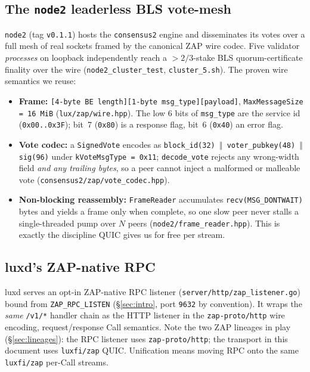 \documentclass[11pt,a4paper]{article}
\newcommand{\code}[1]{\texttt{#1}}
\begin{document}
\subsection{The \texttt{node2} leaderless BLS vote-mesh}\label{sec:proven-node2}

\code{node2} (tag \code{v0.1.1}) hosts the \code{consensus2} engine and
disseminates its votes over a full mesh of real sockets framed by the
canonical ZAP wire codec. Five validator \emph{processes} on loopback
independently reach a $>2/3$-stake BLS quorum-certificate finality over
the wire (\code{node2\_cluster\_test}, \code{cluster\_5.sh}). The proven
wire semantics we reuse:

\begin{itemize}[nosep]
  \item \textbf{Frame:} \code{[4-byte BE length][1-byte msg\_type][payload]},
        \code{MaxMessageSize = 16\,MiB} (\code{lux/zap/wire.hpp}). The
        low 6 bits of \code{msg\_type} are the service id
        (\code{0x00..0x3F}); bit~7 (\code{0x80}) is a response flag,
        bit~6 (\code{0x40}) an error flag.
  \item \textbf{Vote codec:} a \code{SignedVote} encodes as
        \code{block\_id(32) $\Vert$ voter\_pubkey(48) $\Vert$ sig(96)}
        under \code{kVoteMsgType = 0x11}; \code{decode\_vote} rejects any
        wrong-width field \emph{and any trailing bytes}, so a peer cannot
        inject a malformed or malleable vote
        (\code{consensus2/zap/vote\_codec.hpp}).
  \item \textbf{Non-blocking reassembly:} \code{FrameReader} accumulates
        \code{recv(MSG\_DONTWAIT)} bytes and yields a frame only when
        complete, so one slow peer never stalls a single-threaded pump
        over $N$ peers (\code{node2/frame\_reader.hpp}). This is exactly
        the discipline QUIC gives us for free per stream.
\end{itemize}

\subsection{luxd's ZAP-native RPC}\label{sec:proven-rpc}

luxd serves an opt-in ZAP-native RPC listener
(\code{server/http/zap\_listener.go}) bound from \code{ZAP\_RPC\_LISTEN}
(\S\ref{sec:intro}, port \code{9632} by convention). It wraps the
\emph{same} \code{/v1/*} handler chain as the HTTP listener in the
\code{zap-proto/http} wire encoding, request/response Call semantics.
Note the two ZAP lineages in play (\S\ref{sec:lineages}): the RPC
listener uses \code{zap-proto/http}; the transport in this document uses
\code{luxfi/zap} QUIC. Unification means moving RPC onto the same
\code{luxfi/zap} per-Call streams.
\end{document}
